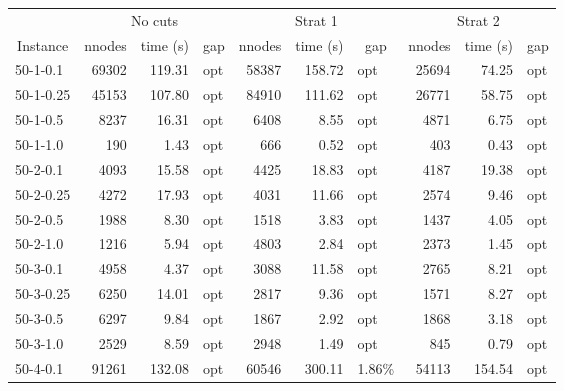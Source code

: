 \documentclass[11pt]{article}
\begin{document}
\begin{table}[]
\begin{tabular}{lrrlrrlrrl}
          & \multicolumn{3}{c}{No cuts} & \multicolumn{3}{c}{Strat 1}                 & \multicolumn{3}{c}{Strat 2} \\
\multicolumn{1}{c}{Instance} &
  \multicolumn{1}{c}{nnodes} &
  \multicolumn{1}{c}{time (s)} &
  \multicolumn{1}{c}{gap} &
  \multicolumn{1}{c}{nnodes} &
  \multicolumn{1}{c}{time (s)} &
  \multicolumn{1}{c}{gap} &
  \multicolumn{1}{c}{nnodes} &
  \multicolumn{1}{c}{time (s)} &
  \multicolumn{1}{c}{gap} \\
50-1-0.1  & 69302    & 119.31   & opt   & 58387 & 158.72 & opt                        & 25694    & 74.25    & opt   \\
50-1-0.25 & 45153    & 107.80   & opt   & 84910 & 111.62 & opt                        & 26771    & 58.75    & opt   \\
50-1-0.5  & 8237     & 16.31    & opt   & 6408  & 8.55   & opt                        & 4871     & 6.75     & opt   \\
50-1-1.0  & 190      & 1.43     & opt   & 666   & 0.52   & opt                        & 403      & 0.43     & opt   \\
50-2-0.1  & 4093     & 15.58    & opt   & 4425  & 18.83  & opt                        & 4187     & 19.38    & opt   \\
50-2-0.25 & 4272     & 17.93    & opt   & 4031  & 11.66  & opt                        & 2574     & 9.46     & opt   \\
50-2-0.5  & 1988     & 8.30     & opt   & 1518  & 3.83   & opt                        & 1437     & 4.05     & opt   \\
50-2-1.0  & 1216     & 5.94     & opt   & 4803  & 2.84   & opt                        & 2373     & 1.45     & opt   \\
50-3-0.1  & 4958     & 4.37     & opt   & 3088  & 11.58  & opt                        & 2765     & 8.21     & opt   \\
50-3-0.25 & 6250     & 14.01    & opt   & 2817  & 9.36   & opt                        & 1571     & 8.27     & opt   \\
50-3-0.5  & 6297     & 9.84     & opt   & 1867  & 2.92   & opt                        & 1868     & 3.18     & opt   \\
50-3-1.0  & 2529     & 8.59     & opt   & 2948  & 1.49   & opt                        & 845      & 0.79     & opt   \\
50-4-0.1  & 91261    & 132.08   & opt   & 60546 & 300.11 & \multicolumn{1}{r}{1.86\%} & 54113    & 154.54   & opt   \\

\end{tabular}
\end{table}
\end{document}
